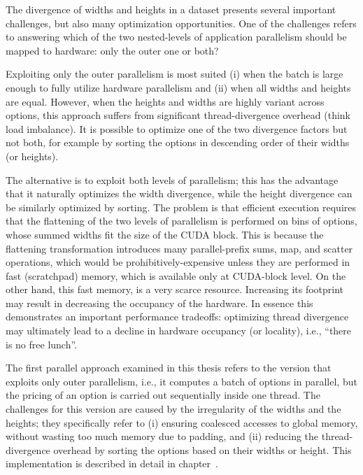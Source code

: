 The divergence of widths and heights in a dataset presents several important challenges, but also many optimization opportunities. One of the challenges refers to answering which of the two nested-levels of application parallelism should be mapped to hardware: only the outer one or both? 

Exploiting only the outer parallelism is most suited (i) when the batch is large enough to fully utilize hardware parallelism and (ii) when all widths and heights are equal. However, when the heights and widths are highly variant across options, this approach suffers from significant thread-divergence overhead (think load imbalance). It is possible to optimize one of the two divergence factors but not both, for example by sorting the options in descending order of their widths (or heights).

The alternative is to exploit both levels of parallelism; this has the advantage that it naturally optimizes the width divergence, while the height divergence can be similarly optimized by sorting.   The problem is that efficient execution requires that the flattening of the two levels of parallelism is performed on bins of options, whose summed widths fit the size of the CUDA block.  This is because the flattening transformation introduces many parallel-prefix sums, map, and scatter operations, which would be prohibitively-expensive unless they are performed in fast (scratchpad) memory, which is available only at CUDA-block level. On the other hand, this fast memory, is a very scarce resource.   Increasing its footprint may result in decreasing the occupancy of the hardware.  In essence this demonstrates an important performance tradeoffs: optimizing thread divergence may ultimately lead to a decline in hardware occupancy (or locality), i.e., ``there is no free lunch''.

The first parallel approach examined in this thesis refers to the version that exploits only outer parallelism, i.e., it computes a batch of options in parallel, but the pricing of an option is carried out sequentially inside one thread.  The challenges for this version are caused by the irregularity of the widths and the heights; they specifically refer to (i) ensuring coalesced accesses to global memory, without wasting too much memory due to padding, and (ii) reducing the thread-divergence overhead by sorting the options based on their widths or height.  This implementation is described in detail in chapter~\cite{chapter:oneoptionperthread}.

